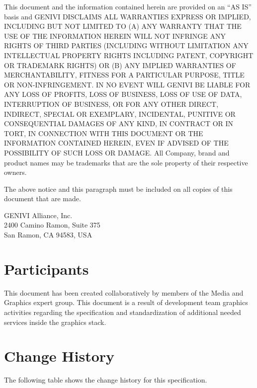 \documentclass[a4paper]{article}
\begin{document}
\begin{titlepage}
This document and the information contained herein are provided on an “AS IS” basis and GENIVI
DISCLAIMS ALL WARRANTIES EXPRESS OR IMPLIED, INCLUDING BUT NOT LIMITED TO (A) ANY WARRANTY THAT
THE USE OF THE INFORMATION HEREIN WILL NOT INFRINGE ANY RIGHTS OF THIRD PARTIES (INCLUDING
WITHOUT LIMITATION ANY INTELLECTUAL PROPERTY RIGHTS INCLUDING PATENT, COPYRIGHT OR TRADEMARK
RIGHTS) OR (B) ANY IMPLIED WARRANTIES OF MERCHANTABILITY, FITNESS FOR A PARTICULAR PURPOSE,
TITLE OR NON-INFRINGEMENT. IN NO EVENT WILL GENIVI BE LIABLE FOR ANY LOSS OF PROFITS, LOSS OF
BUSINESS, LOSS OF USE OF DATA, INTERRUPTION OF BUSINESS, OR FOR ANY OTHER DIRECT, INDIRECT,
SPECIAL OR EXEMPLARY, INCIDENTAL, PUNITIVE OR CONSEQUENTIAL DAMAGES OF ANY KIND, IN CONTRACT
OR IN TORT, IN CONNECTION WITH THIS DOCUMENT OR THE INFORMATION CONTAINED HEREIN, EVEN IF
ADVISED OF THE POSSIBILITY OF SUCH LOSS OR DAMAGE. All Company, brand and product names may be
trademarks that are the sole property of their respective owners.


The above notice and this paragraph must be included on all copies of this document that are made.


GENIVI Alliance, Inc.\\
2400 Camino Ramon, Suite 375\\
San Ramon, CA  94583, USA

\section*{Participants}
This document has been created collaboratively by members of the Media and Graphics expert group.
This document is a result of development team graphics activities regarding the specification and
standardization of additional needed services inside the graphics stack.

\section*{Change History}
The following table shows the change history for this specification.


\end{titlepage}
\end{document}
